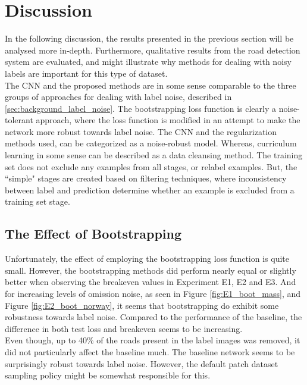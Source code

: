\section{Discussion}
\label{sec:Discussion}
In the following discussion, the results presented in the previous section will be analysed more in-depth. Furthermore, qualitative results from the road detection system are evaluated, and might illustrate why methods for dealing with noisy labels are important for this type of dataset.\\

The \ac{CNN} and the proposed methods are in some sense comparable to the three groups of approaches for dealing with label noise, described in \ref{sec:background_label_noise}. The bootstrapping loss function is clearly a noise-tolerant approach, where the loss function is modified in an attempt to make the network more robust towards label noise. The \ac{CNN} and the regularization methods used, can be categorized as a noise-robust model. Whereas, curriculum learning in some sense can be described as a data cleansing method. The training set does not exclude any examples from all stages, or relabel examples. But, the ``simple" stages are created based on filtering techniques, where inconsistency between label and prediction determine whether an example is excluded from a training set stage.  \\

\subsection{The Effect of Bootstrapping}
Unfortunately, the effect of employing the bootstrapping loss function is quite small. However, the bootstrapping methods did perform nearly equal or slightly better when observing the breakeven values in Experiment E1, E2 and E3. And for increasing levels of omission noise,  as seen in Figure \ref{fig:E1_boot_mass}, and Figure \ref{fig:E2_boot_norway}, it seems that bootstrapping do exhibit some robustness towards label noise. Compared to the performance of the baseline, the difference in both test loss and breakeven seems to be increasing.  \\

Even though, up to 40\% of the roads present in the label images was removed, it did not particularly affect the baseline much. The baseline network seems to be surprisingly robust towards label noise. However, the default patch dataset sampling policy might be somewhat responsible for this.\\


